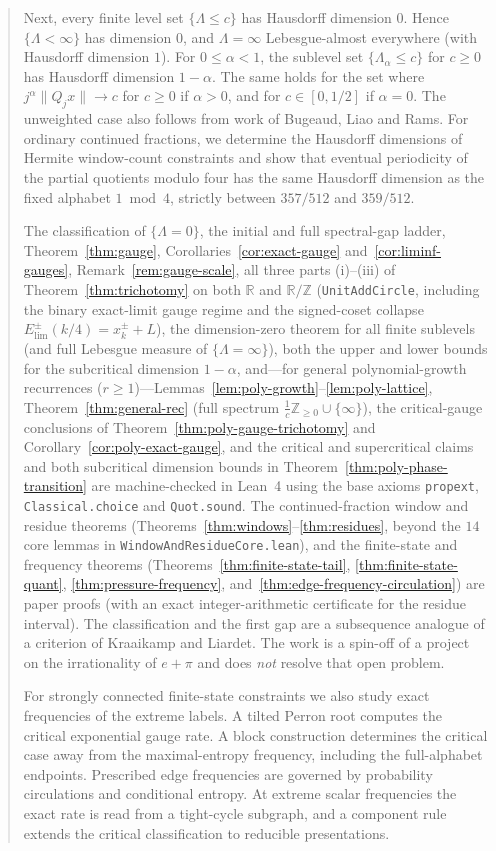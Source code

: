 \documentclass[11pt]{article}
\theoremstyle{definition}
\theoremstyle{remark}
\newcommand{\R}{\mathbb{R}}
\newcommand{\Z}{\mathbb{Z}}
\newcommand{\Lam}{\Lambda}
\begin{document}
\begin{abstract}
Next, every finite level set $\{\Lam\le c\}$ has Hausdorff dimension $0$.
Hence $\{\Lam<\infty\}$ has dimension $0$, and $\Lam=\infty$ Lebesgue-almost
everywhere (with Hausdorff dimension $1$). For $0\le\alpha<1$, the sublevel set $\{\Lam_\alpha\le c\}$ for $c\ge0$
has Hausdorff dimension $1-\alpha$. The same holds for the set where
$j^\alpha\|Q_jx\|\to c$ for $c\ge0$ if $\alpha>0$, and for
$c\in[0,1/2]$ if $\alpha=0$. The unweighted case also follows from work
of Bugeaud, Liao and Rams. For ordinary continued fractions,
we determine the Hausdorff dimensions of Hermite window-count constraints and
show that eventual periodicity of the partial quotients modulo four has the same
Hausdorff dimension as the fixed alphabet $1\bmod 4$, strictly between $357/512$
and $359/512$.

The classification of $\{\Lam=0\}$, the initial and full spectral-gap ladder,
Theorem~\ref{thm:gauge},
Corollaries~\ref{cor:exact-gauge} and~\ref{cor:liminf-gauges},
Remark~\ref{rem:gauge-scale}, all three parts (i)--(iii) of
Theorem~\ref{thm:trichotomy} on both $\R$ and $\R/\Z$ (\texttt{UnitAddCircle},
including the binary exact-limit gauge regime and the signed-coset collapse
$E_{\mathrm{lim}}^\pm(k/4)=x_k^\pm+L$), the dimension-zero theorem for all
finite sublevels (and full Lebesgue measure of $\{\Lam=\infty\}$), both the upper
and lower bounds for the subcritical dimension $1-\alpha$, and—for general
polynomial-growth recurrences ($r\ge1$)—Lemmas~\ref{lem:poly-growth}--\ref{lem:poly-lattice},
Theorem~\ref{thm:general-rec} (full spectrum $\frac1c\Z_{\ge0}\cup\{\infty\}$),
the critical-gauge conclusions of Theorem~\ref{thm:poly-gauge-trichotomy}
and Corollary~\ref{cor:poly-exact-gauge}, and the critical and supercritical
claims and both subcritical dimension bounds in Theorem~\ref{thm:poly-phase-transition}
are machine-checked in Lean~4 using the base axioms \texttt{propext},
\texttt{Classical.choice} and \texttt{Quot.sound}. The continued-fraction
window and residue theorems
(Theorems~\ref{thm:windows}--\ref{thm:residues}, beyond the $14$ core lemmas in
\texttt{WindowAndResidueCore.lean}), and the finite-state and frequency
theorems (Theorems~\ref{thm:finite-state-tail}, \ref{thm:finite-state-quant},
\ref{thm:pressure-frequency}, and~\ref{thm:edge-frequency-circulation})
are paper proofs (with an exact
integer-arithmetic certificate for the residue interval). The classification and
the first gap are a subsequence analogue of a criterion of Kraaikamp and
Liardet. The work is a spin-off of a project on the irrationality of $e+\pi$ and
does \emph{not} resolve that open problem.

For strongly connected finite-state constraints we also study exact
frequencies of the extreme labels. A tilted Perron root computes
the critical exponential gauge rate. A block construction determines
the critical case away from the maximal-entropy frequency, including
the full-alphabet endpoints.
Prescribed edge frequencies are governed by probability circulations
and conditional entropy. At extreme scalar frequencies the exact
rate is read from a tight-cycle subgraph, and a component rule
extends the critical classification to reducible presentations.
\end{abstract}
\end{document}

